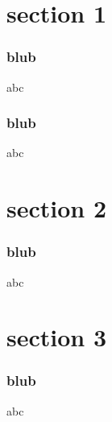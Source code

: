\documentclass{beamer}
\begin{document}
\section{section 1}
\begin{frame}
\frametitle{blub}
    abc
\end{frame} 
\begin{frame}
\frametitle{blub}
    abc
\end{frame} 

\section{section 2}
\begin{frame}
\frametitle{blub}
    abc
\end{frame} 

\section{section 3}
\begin{frame}
\frametitle{blub}
    abc
\end{frame}     
\end{document}
